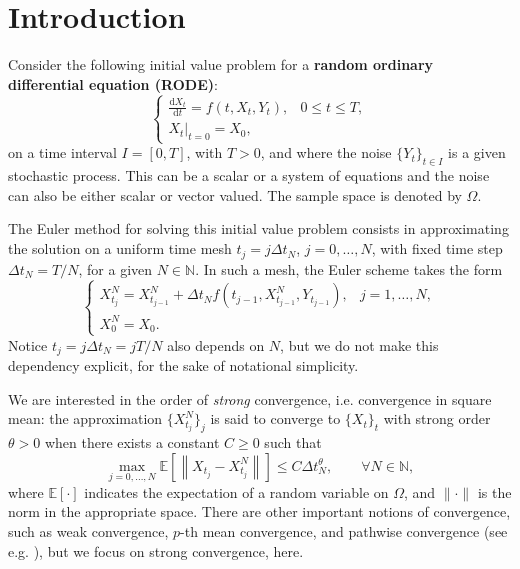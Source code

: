 \documentclass[reqno,12pt]{amsart}
\theoremstyle{plain} %
\theoremstyle{definition} %
\begin{document}
\maketitle

\section{Introduction}

Consider the following initial value problem for a \textbf{random ordinary differential equation (RODE)}:
\begin{equation}
  \label{rodeeq}
  \begin{cases}
    \displaystyle \frac{\mathrm{d}X_t}{\mathrm{d} t} = f(t, X_t, Y_t), & 0 \leq t \leq T, \\
    \left. X_t \right|_{t = 0} = X_0,
  \end{cases}
\end{equation}
on a time interval $I=[0, T]$, with $T > 0$, and where the noise $\{Y_t\}_{t\in I}$ is a given stochastic process. This can be a scalar or a system of equations and the noise can also be either scalar or vector valued. The sample space is denoted by $\Omega$.

The Euler method for solving this initial value problem consists in approximating the solution on a uniform time mesh $t_j = j\Delta t_N$, $j = 0, \ldots, N$, with fixed time step $\Delta t_N = T/N$, for a given $N\in \mathbb{N}$. In such a mesh, the Euler scheme takes the form
\begin{equation}
  \label{emscheme}
  \begin{cases}
    X_{t_j}^N = X_{t_{j-1}}^N + \Delta t_N f(t_{j-1}, X_{t_{j-1}}^N, Y_{t_{j-1}}), & j = 1, \ldots, N, \\
    X_0^N = X_0.
  \end{cases}
\end{equation}
Notice $t_j = j\Delta t_N = jT/N$ also depends on $N$, but we do not make this dependency explicit, for the sake of notational simplicity.

We are interested in the order of \emph{strong} convergence, i.e. convergence in square mean: the approximation $\{X_{t_j}^N\}_j$ is said to converge to $\{X_t\}_t$ with strong order $\theta>0$ when there exists a constant $C \geq 0$ such that
\begin{equation}
    \label{strongordertheta}
    \max_{j=0, \ldots, N}\mathbb{E}\left[ \left\| X_{t_j} - X_{t_j}^N \right\| \right] \leq C \Delta t_N^\theta, \qquad \forall N \in \mathbb{N},
\end{equation}
where $\mathbb{E}[\cdot]$ indicates the expectation of a random variable on $\Omega$, and $\|\cdot\|$ is the norm in the appropriate space. There are other important notions of convergence, such as weak convergence, $p$-th mean convergence, and pathwise convergence (see e.g. \cite{HanKloeden2017,HighamKloeden2021, JentzenKloeden2011}), but we focus on strong convergence, here.
\end{document}
